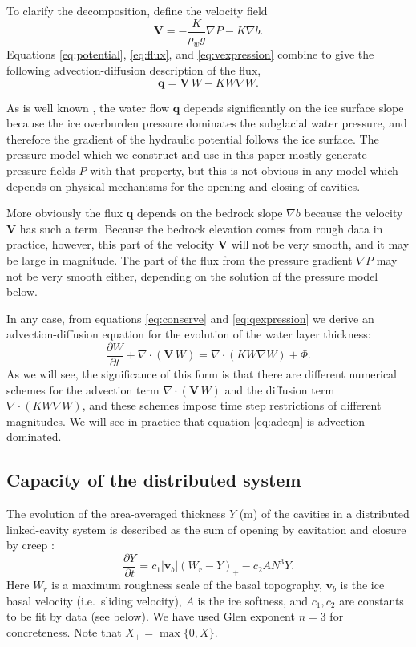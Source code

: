 \documentclass[11pt,final]{amsart}%
\newcommand\bv{\mathbf{v}}
\newcommand\bV{\mathbf{V}}
\newcommand\bq{\mathbf{q}}
\newcommand{\Div}{\nabla\cdot}
\newcommand{\grad}{\nabla}
\begin{document}
To clarify the decomposition, define the velocity field
\begin{equation} \label{eq:vexpression}
  \bV = - \frac{K}{\rho_w g} \grad P - K \grad b.
\end{equation}
Equations \eqref{eq:potential}, \eqref{eq:flux}, and \eqref{eq:vexpression} combine to give the following advection-diffusion description of the flux,
\begin{equation} \label{eq:qexpression}
  \bq = \bV\, W - K W \grad W.
\end{equation}

As is well known \citep{Clarke05}, the water flow $\bq$ depends significantly on the ice surface slope because the ice overburden pressure dominates the subglacial water pressure, and therefore the gradient of the hydraulic potential follows the ice surface.  The pressure model which we construct and use in this paper mostly generate pressure fields $P$ with that property, but this is not obvious in any model which depends on physical mechanisms for the opening and closing of cavities.

More obviously the flux $\bq$ depends on the bedrock slope $\grad b$ because the velocity $\bV$ has such a term.  Because the bedrock elevation comes from rough data in practice, however, this part of the velocity $\bV$ will not be very smooth, and it may be large in magnitude.  The part of the flux from the pressure gradient $\grad P$ may not be very smooth either, depending on the solution of the pressure model below.

In any case, from equations \eqref{eq:conserve} and \eqref{eq:qexpression} we derive an advection-diffusion equation \citep{HundsdorferVerwer2010} for the evolution of the water layer thickness:
\begin{equation} \label{eq:adeqn}
  \frac{\partial W}{\partial t} + \Div\left(\bV\, W\right) = \Div \left(K W \grad W\right) + \Phi.
\end{equation}
As we will see, the significance of this form is that there are different numerical schemes for the advection term $\Div\left(\bV\, W\right)$ and the diffusion term $\Div \left(K W \grad W\right)$, and these schemes impose time step restrictions of different magnitudes.  We will see in practice that equation \eqref{eq:adeqn} is advection-dominated.

\subsection*{Capacity of the distributed system}  The evolution of the area-averaged thickness $Y$ (m) of the cavities in a distributed linked-cavity system \citep{Schoofetal2012} is described as the sum of opening by cavitation and closure by creep \citep{Hewitt2011}:
\begin{equation}
\frac{\partial Y}{\partial t} = c_1 |\bv_b| (W_r - Y)_+ - c_2 A N^3 Y. \label{eq:capacity}
\end{equation}
Here $W_r$ is a maximum roughness scale of the basal topography, $\bv_b$ is the ice basal velocity (i.e.~sliding velocity), $A$ is the ice softness, and $c_1,c_2$ are constants to be fit by data (see below).  We have used Glen exponent $n=3$ for concreteness.  Note that $X_+= \max\{0,X\}$.
\end{document}
